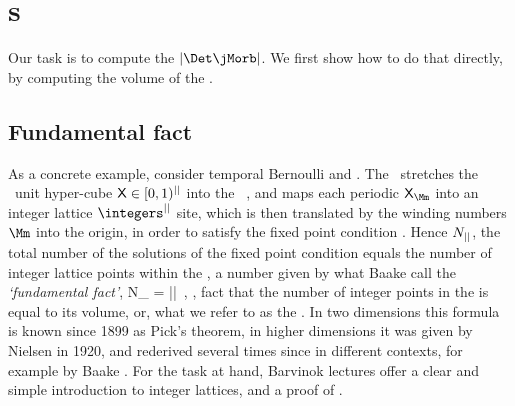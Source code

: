\section{\HillDet s}
\label{s:HillDet}

Our task is to compute the {\HillDet} $|\Det\jMorb|$. We first show how
to do that directly, by computing the volume of the {\fundPip}.

\subsection{Fundamental fact} %
\label{sect:fundFact}

As a concrete example, consider {temporal Bernoulli} and
{\templatt}. 
The {\jacobianOrb} \jMorb\ stretches the \statesp\ unit hyper-cube
$\mathsf{X}\in[0,1)^{||}$ into the \cl{}\dmn\ {\em \fundPip}, and maps each
periodic {\lattstate} ${\Xx}_{\Mm}$ into an integer lattice $\integers^\cl{}$
site, which is then translated by the winding numbers $\Mm$ into the
origin, in order to satisfy the fixed point condition
. Hence $N_{||}$, the total number of the solutions
of the fixed point condition equals the number of integer lattice points
within the {\fundPip}, a number given by what Baake \etal{}
call the \emph{`fundamental fact'},
\beq
N_\cl{} = |\Det\jMorb|
\,,
\ie, fact that the number of integer points in the {\fundPip} is equal to
its volume, or, what we refer to as the {\HillDet}. In two
dimensions this formula is known since 1899 as
 {Pick's theorem},
in higher dimensions it was given by Nielsen in
1920, and rederived several times since in different contexts, for
example by Baake \etal{}. For the task at hand,
Barvinok
 {lectures}
offer a clear and simple introduction to integer lattices, and a proof of
.


